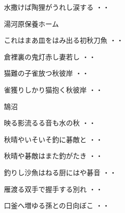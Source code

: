 \begin{shiika}水撒けば陶狸がうれし涙する
\hfill{・・}\end{shiika}
\vspace{0.6cm}
湯河原保養ホーム
\begin{shiika}これはまあ皿をはみ出る初秋刀魚
\hfill{・・}\end{shiika}
\vspace{0.6cm}
\begin{shiika}倉裡裏の鬼灯赤し妻若し
\hfill{・・}\end{shiika}
\vspace{0.6cm}
\begin{shiika}猫難の子雀放つ秋彼岸
\hfill{・・}\end{shiika}
\vspace{0.6cm}
\begin{shiika}雀獲りしかり猫抱く秋彼岸
\hfill{・・}\end{shiika}
\vspace{0.6cm}
鵠沼
\begin{shiika}映る影流るる音も水の秋
\hfill{・・}\end{shiika}
\vspace{0.6cm}
\begin{shiika}秋晴やいそいそ釣に碁敵と
\hfill{・・}\end{shiika}
\vspace{0.6cm}
\begin{shiika}秋晴や碁敵はまた釣がたき
\hfill{・・}\end{shiika}
\vspace{0.6cm}
\begin{shiika}釣りし沙魚はねる厨にはや碁音
\hfill{・・}\end{shiika}
\vspace{0.6cm}
\begin{shiika}雁渡る双手で握手する別れ
\hfill{・・}\end{shiika}
\vspace{0.6cm}
\begin{shiika}口釜へ増ゆる孫との日向ぼこ
\hfill{・・}\end{shiika}
\vspace{0.6cm}
